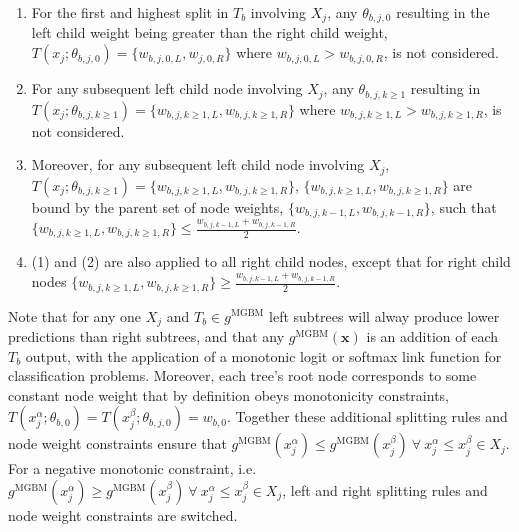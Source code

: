 \documentclass[information,article,submit,moreauthors,pdftex]{definitions/mdpi}
\begin{document}
\begin{enumerate}[leftmargin=*,labelsep=4.9mm]
\item For the first and highest split in $T_b$ involving $X_j$, any $\theta_{b,j,0}$ resulting in the left child weight being greater than the right child weight, $T(x_j; \theta_{b,j,0}) = \{w_{b,j,0,L}, w_{j,0,R}\}$ where $w_{b,j,0,L} > w_{b,j,0,R}$, is not considered. 
\item For any subsequent left child node involving $X_j$, any $\theta_{b,j, k\ge1}$ resulting in $T(x_j; \theta_{b,j,k\ge1}) = \{w_{b,j,k\ge1,L}, w_{b,j,k\ge1,R}\}$ where $w_{b,j,k\ge1,L} > w_{b,j,k\ge1,R}$, is not considered.
\item Moreover, for any subsequent left child node involving $X_j$, $T(x_j; \theta_{b,j,k\ge1}) = \{w_{b,j,k\ge1,L}, w_{b,j,k\ge1,R}\}$, $\{w_{b,j,k\ge1,L}, w_{b,j,k\ge1,R}\}$ are bound by the parent set of node weights, $\{w_{b,j,k-1,L}, w_{b,j,k-1, R}\}$, such that $ \{w_{b,j,k\ge1,L}, w_{b,j,k\ge1,R}\} \le \frac{w_{b,j,k-1,L} + w_{b,j,k-1,R}}{2}$.
\item (1) and (2) are also applied to all right child nodes, except that for right child nodes $\{w_{b,j,k\ge1,L}, w_{b,j,k\ge1,R}\} \ge \frac{w_{b,j,k-1,L} + w_{b,j,k-1,R}}{2}$.
\end{enumerate}

\noindent Note that for any one $X_j$ and $T_b \in g^{\text{MGBM}}$ left subtrees will alway produce lower predictions than right subtrees, and that any $g^{\text{MGBM}}(\mathbf{x})$ is an addition of each $T_b$ output, with the application of a monotonic logit or softmax link function for classification problems. Moreover, each tree's root node corresponds to some constant node weight that by definition obeys monotonicity constraints, $ T(x^{\alpha}_j; \theta_{b,0}) = T(x^{\beta}_j; \theta_{b,j,0}) = w_{b,0}$. Together these additional splitting rules and node weight constraints ensure that $g^{\text{MGBM}}(x^{\alpha}_j)  \le g^{\text{MGBM}}(x^{\beta}_j) ~\forall ~x^{\alpha}_j \le x^{\beta}_j \in X_j$. For a negative monotonic constraint, i.e. $g^{\text{MGBM}}(x^{\alpha}_j)  \ge g^{\text{MGBM}}(x^{\beta}_j) ~\forall ~x^{\alpha}_j \le x^{\beta}_j \in X_j$, left and right splitting rules and node weight constraints are switched.\\
\end{document}
